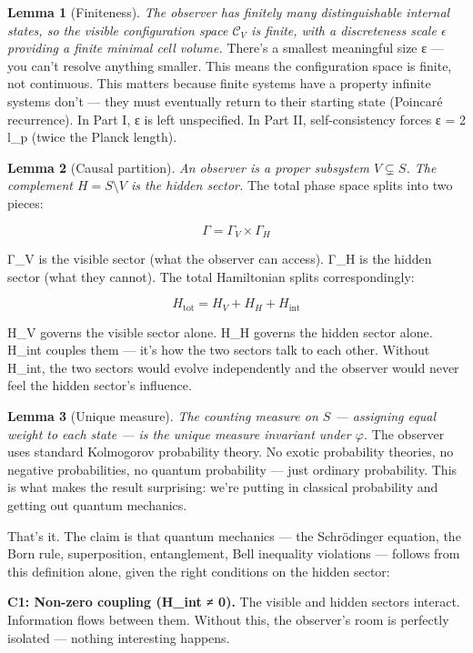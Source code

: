 \documentclass[
]{article}
\begin{document}
\textbf{Lemma 1} (Finiteness). \emph{The observer has finitely many
distinguishable internal states, so the visible configuration space
\(\mathcal{C}_V\) is finite, with a discreteness scale \(\epsilon\)
providing a finite minimal cell volume.} There's a smallest meaningful
size ε --- you can't resolve anything smaller. This means the
configuration space is finite, not continuous. This matters because
finite systems have a property infinite systems don't --- they must
eventually return to their starting state (Poincaré recurrence). In Part
I, ε is left unspecified. In Part II, self-consistency forces ε = 2 l\_p
(twice the Planck length).

\textbf{Lemma 2} (Causal partition). \emph{An observer is a proper
subsystem \(V \subsetneq S\). The complement \(H = S \setminus V\) is
the hidden sector.} The total phase space splits into two pieces:

\[\Gamma = \Gamma_V \times \Gamma_H\]

Γ\_V is the visible sector (what the observer can access). Γ\_H is the
hidden sector (what they cannot). The total Hamiltonian splits
correspondingly:

\[H_{\text{tot}} = H_V + H_H + H_{\text{int}}\]

H\_V governs the visible sector alone. H\_H governs the hidden sector
alone. H\_int couples them --- it's how the two sectors talk to each
other. Without H\_int, the two sectors would evolve independently and
the observer would never feel the hidden sector's influence.

\textbf{Lemma 3} (Unique measure). \emph{The counting measure on \(S\)
--- assigning equal weight to each state --- is the unique measure
invariant under \(\varphi\).} The observer uses standard Kolmogorov
probability theory. No exotic probability theories, no negative
probabilities, no quantum probability --- just ordinary probability.
This is what makes the result surprising: we're putting in classical
probability and getting out quantum mechanics.

That's it. The claim is that quantum mechanics --- the Schrödinger
equation, the Born rule, superposition, entanglement, Bell inequality
violations --- follows from this definition alone, given the right
conditions on the hidden sector:

\textbf{C1: Non-zero coupling (H\_int ≠ 0).} The visible and hidden
sectors interact. Information flows between them. Without this, the
observer's room is perfectly isolated --- nothing interesting happens.
\end{document}
